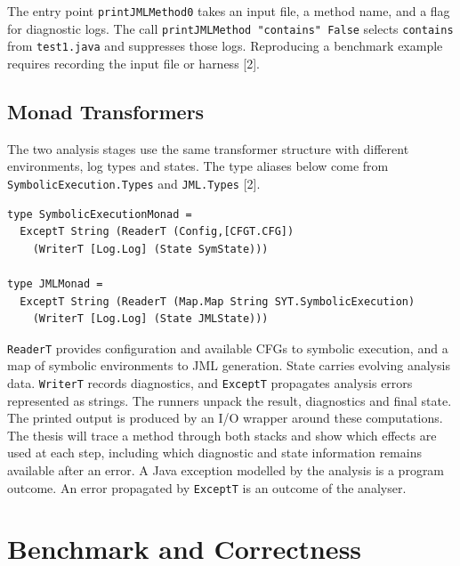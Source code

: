 \documentclass[11pt,a4paper]{article}
\begin{document}
\begin{samepage}
The entry point \texttt{printJMLMethod0} takes an input file, a method name, and a flag for diagnostic logs. The call \texttt{printJMLMethod "contains" False} selects \texttt{contains} from \texttt{test1.java} and suppresses those logs. Reproducing a benchmark example requires recording the input file or harness [2].
\par
\end{samepage}

\subsection{Monad Transformers}
The two analysis stages use the same transformer structure with different environments, log types and states. The type aliases below come from \texttt{SymbolicExecution.Types} and \texttt{JML.Types} [2].

\begin{samepage}
\small
\begin{verbatim}
type SymbolicExecutionMonad =
  ExceptT String (ReaderT (Config,[CFGT.CFG])
    (WriterT [Log.Log] (State SymState)))

type JMLMonad =
  ExceptT String (ReaderT (Map.Map String SYT.SymbolicExecution)
    (WriterT [Log.Log] (State JMLState)))
\end{verbatim}
\end{samepage}
\texttt{ReaderT} provides configuration and available CFGs to symbolic execution, and a map of symbolic environments to JML generation. State carries evolving analysis data. \texttt{WriterT} records diagnostics, and \texttt{ExceptT} propagates analysis errors represented as strings. The runners unpack the result, diagnostics and final state. The printed output is produced by an I/O wrapper around these computations. The thesis will trace a method through both stacks and show which effects are used at each step, including which diagnostic and state information remains available after an error. A Java exception modelled by the analysis is a program outcome. An error propagated by \texttt{ExceptT} is an outcome of the analyser.

\section{Benchmark and Correctness}
\end{document}
